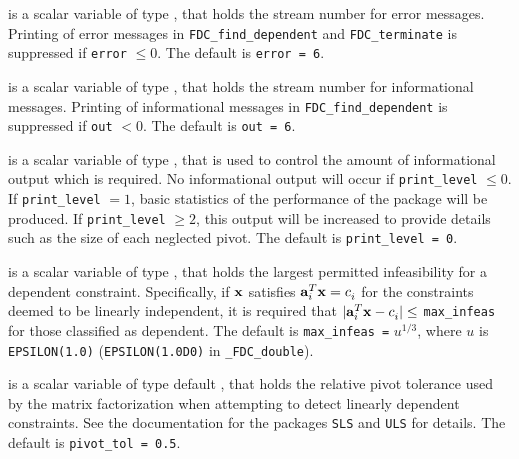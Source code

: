 \documentclass{galahad}
\newcommand{\packagename}{FDC}
\newcommand{\fullpackagename}{\libraryname\_\-\packagename}
\begin{document}
\begin{description}

 is a scalar variable of type \integer, that holds the
stream number for error messages. Printing of error messages in
{\tt \packagename\_find\_dependent} and {\tt \packagename\_terminate}
is suppressed if {\tt error} $\leq 0$.
The default is {\tt error = 6}.

 is a scalar variable of type \integer, that holds the
stream number for informational messages. Printing of informational messages in
{\tt \packagename\_find\_dependent} is suppressed if {\tt out} $< 0$.
The default is {\tt out = 6}.

 is a scalar variable of type \integer, that is used
to control the amount of informational output which is required. No
informational output will occur if {\tt print\_level} $\leq 0$. If
{\tt print\_level} $= 1$, basic statistics of the performance of the
package will be produced. If {\tt print\_level} $\geq 2$, this output will be
increased to provide details such as the size of each neglected pivot.
The default is {\tt print\_level = 0}.



 is a scalar variable of type \realdp, that holds the
largest permitted infeasibility for a dependent constraint. Specifically, if
${\mathbf{x}}$ satisfies ${\mathbf{a}}_i^T {\mathbf{x}} = c_i^{}$ for the constraints deemed to be
linearly independent, it is required that $|{\mathbf{a}}_i^T {\mathbf{x}} - c_i^{}| \leq$
{\tt max\_infeas} for those classified as dependent.
The default is {\tt max\_infeas =} $u^{1/3}$,
where $u$ is {\tt EPSILON(1.0)} ({\tt EPSILON(1.0D0)} in
{\tt \fullpackagename\_double}).

 is a scalar variable of type default
\realdp, that holds the
relative pivot  tolerance used by the matrix factorization when
attempting to detect linearly dependent constraints.
See the documentation for the packages {\tt SLS} and {\tt ULS} for details.
The default is {\tt pivot\_tol = 0.5}.


\end{description}
\end{document}
